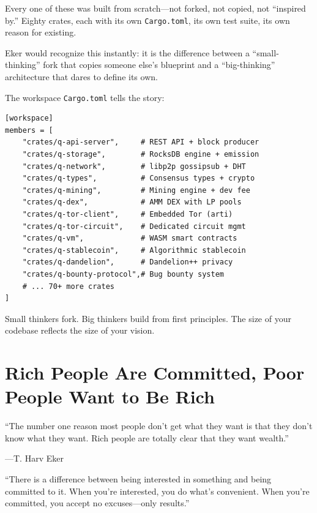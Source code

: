 \documentclass[11pt,a4paper]{article}
\begin{document}
Every one of these was built from scratch---not forked, not copied, not
``inspired by.'' Eighty crates, each with its own \texttt{Cargo.toml},
its own test suite, its own reason for existing.

Eker would recognize this instantly: it is the difference between a
``small-thinking'' fork that copies someone else's blueprint and a
``big-thinking'' architecture that dares to define its own.

The workspace \texttt{Cargo.toml} tells the story:

\begin{lstlisting}[caption={The Scale of Ambition (\texttt{Cargo.toml}, abbreviated)}]
[workspace]
members = [
    "crates/q-api-server",     # REST API + block producer
    "crates/q-storage",        # RocksDB engine + emission
    "crates/q-network",        # libp2p gossipsub + DHT
    "crates/q-types",          # Consensus types + crypto
    "crates/q-mining",         # Mining engine + dev fee
    "crates/q-dex",            # AMM DEX with LP pools
    "crates/q-tor-client",     # Embedded Tor (arti)
    "crates/q-tor-circuit",    # Dedicated circuit mgmt
    "crates/q-vm",             # WASM smart contracts
    "crates/q-stablecoin",     # Algorithmic stablecoin
    "crates/q-dandelion",      # Dandelion++ privacy
    "crates/q-bounty-protocol",# Bug bounty system
    # ... 70+ more crates
]
\end{lstlisting}

\begin{principle}[title={\textbf{The Principle}}]
Small thinkers fork. Big thinkers build from first principles.
The size of your codebase reflects the size of your vision.
\end{principle}


\section{Rich People Are Committed, Poor People Want to Be Rich}

\epigraph{``The number one reason most people don't get what they want
is that they don't know what they want. Rich people are totally clear
that they want wealth.''}%
{---T. Harv Eker}

\begin{wealthbox}[title={\raisebox{-0.5pt}{\tiny$\bigstar$} Wealth File \#3}]
``There is a difference between being interested in something and being
committed to it. When you're interested, you do what's convenient.
When you're committed, you accept no excuses---only results.''
\end{wealthbox}
\end{document}

